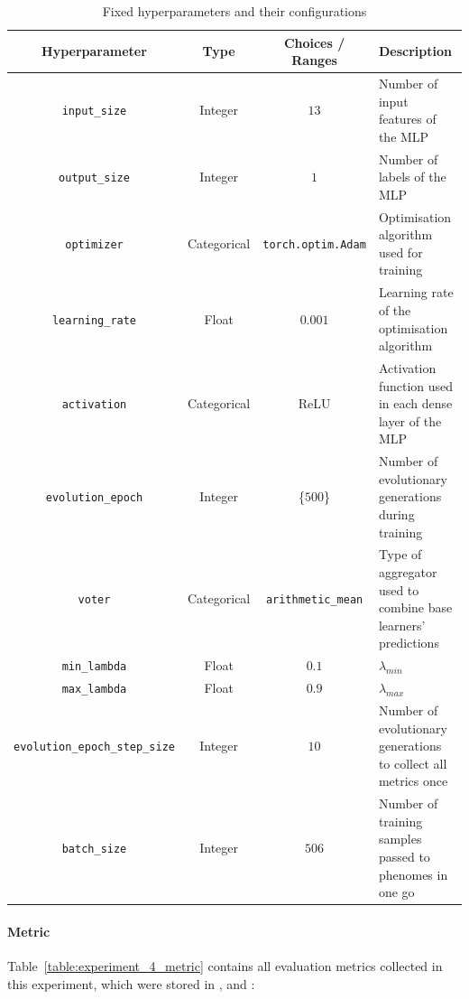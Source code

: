 \documentclass{article}
\begin{document}
\begin{table}[H]
    \centering
    \begin{tabular}{|c|c|c|p{5cm}|}
        \hline
        Hyperparameter & Type & Choices / Ranges & Description \\
        \hline
        \small\texttt{input\_size} & Integer & $13$ & Number of input features of the MLP \\
        \hline
        \small\texttt{output\_size} & Integer & $1$ & Number of labels of the MLP \\
        \hline
        \small\texttt{optimizer} & Categorical & \texttt{torch.optim.Adam} & Optimisation algorithm used for training \\
        \hline
        \small\texttt{learning\_rate} & Float & $0.001$ & Learning rate of the optimisation algorithm \\
        \hline
        \small\texttt{activation} & Categorical & ReLU & Activation function used in each dense layer of the MLP \\
        \hline
        \small\texttt{evolution\_epoch} & Integer & \{$500$\} & Number of evolutionary generations during training \\
        \hline
        \small\texttt{voter} & Categorical & \texttt{arithmetic\_mean} & Type of aggregator used to combine base learners' predictions \\
        \hline
        \small\texttt{min\_lambda} & Float & $0.1$ & $\lambda_{min}$ \\
        \hline
        \small\texttt{max\_lambda} & Float & $0.9$ & $\lambda_{max}$ \\
        \hline
        \small\texttt{evolution\_epoch\_step\_size} & Integer & $10$ & Number of evolutionary generations to collect all metrics once \\
        \hline
        \small\texttt{batch\_size} & Integer & $506$ & Number of training samples passed to phenomes in one go \\
        \hline
    \end{tabular}
    \caption{Fixed hyperparameters and their configurations}
    \label{table:experiment_4_fixed_hyperparameters}
\end{table}

\paragraph{Metric}
Table~\ref{table:experiment_4_metric} contains all evaluation metrics collected in this experiment, which were stored in ,  and : 
\end{document}
